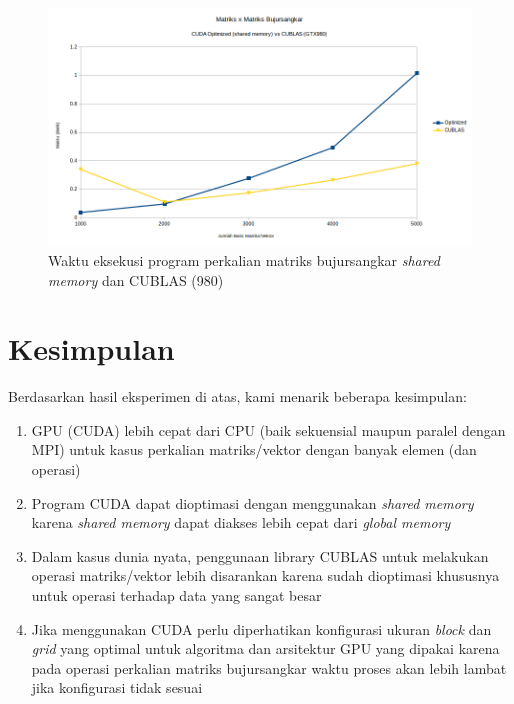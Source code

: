 \begin{figure}
	\centering
	\includegraphics[width=1\textwidth]
	{pics/all_shared_cublas_mm_980}
	\caption{Waktu eksekusi program perkalian matriks bujursangkar \textit{shared memory} dan CUBLAS (980)}
	\label{fig:all_shared_cublas_mm_980}
\end{figure} 

\section{Kesimpulan}

Berdasarkan hasil eksperimen di atas, kami menarik beberapa kesimpulan:

\begin{enumerate}	
	\item GPU (CUDA) lebih cepat dari CPU (baik sekuensial maupun paralel dengan MPI) untuk kasus perkalian matriks/vektor dengan banyak elemen (dan operasi)
	\item Program CUDA dapat dioptimasi dengan menggunakan \textit{shared memory} karena \textit{shared memory} dapat diakses lebih cepat dari \textit{global memory}
	\item Dalam kasus dunia nyata, penggunaan library CUBLAS untuk melakukan operasi matriks/vektor lebih disarankan karena sudah dioptimasi khususnya untuk operasi terhadap data yang sangat besar
	\item Jika menggunakan CUDA perlu diperhatikan konfigurasi ukuran \textit{block} dan \textit{grid} yang optimal untuk algoritma dan arsitektur GPU yang dipakai karena pada operasi perkalian matriks bujursangkar waktu proses akan lebih lambat jika konfigurasi tidak sesuai
\end{enumerate}